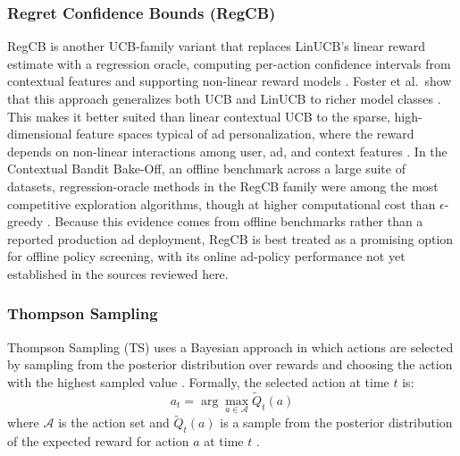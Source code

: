 \documentclass[manuscript,review,screen]{acmart}
\begin{document}
\subsubsection{\textbf{Regret Confidence Bounds (RegCB)}}
RegCB is another UCB-family variant that replaces LinUCB's linear reward estimate with a regression oracle, computing per-action confidence intervals from contextual features and supporting non-linear reward models \cite{foster2018contextual}. Foster et al.\ show that this approach generalizes both UCB and LinUCB to richer model classes \cite{foster2018contextual}. This makes it better suited than linear contextual UCB to the sparse, high-dimensional feature spaces typical of ad personalization, where the reward depends on non-linear interactions among user, ad, and context features \cite{foster2018contextual}. In the Contextual Bandit Bake-Off, an offline benchmark across a large suite of datasets, regression-oracle methods in the RegCB family were among the most competitive exploration algorithms, though at higher computational cost than $\epsilon$-greedy \cite{bietti2021contextual, foster2018contextual}. Because this evidence comes from offline benchmarks rather than a reported production ad deployment, RegCB is best treated as a promising option for offline policy screening, with its online ad-policy performance not yet established in the sources reviewed here.


\subsubsection{\textbf{Thompson Sampling}} Thompson Sampling (TS) uses a Bayesian approach in which actions are selected by sampling from the posterior distribution over rewards and choosing the action with the highest sampled value \cite{Sutton1998, russo2018tutorial}. Formally, the selected action at time $t$ is:
\begin{equation}
a_t = \arg\max_{a \in \mathcal{A}} \tilde{Q}_t(a)
\label{eq:ts}
\end{equation}
where $\mathcal{A}$ is the action set and $\tilde{Q}_t(a)$ is a sample from the posterior distribution of the expected reward for action $a$ at time $t$ \cite{russo2018tutorial}.
\end{document}

